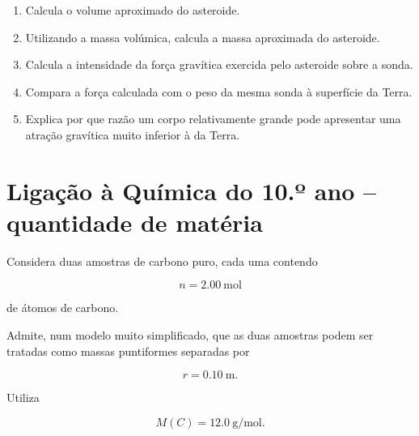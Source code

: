 \documentclass[11pt,a4paper]{article}
\newcommand{\resposta}[1][1]{
	\vspace{#1cm}
}
\begin{document}
	\begin{enumerate}[label=\textbf{\arabic*.},resume]
		
		\item Calcula o volume aproximado do asteroide.
		
		\resposta[1.0]
		
		\item Utilizando a massa volúmica, calcula a massa aproximada do asteroide.
		
		\resposta[1.2]
		
		\item Calcula a intensidade da força gravítica exercida pelo asteroide
		sobre a sonda.
		
		\resposta[1.3]
		
		\item Compara a força calculada com o peso da mesma sonda à superfície
		da Terra.
		
		\resposta[1.0]
		
		\item Explica por que razão um corpo relativamente grande pode apresentar
		uma atração gravítica muito inferior à da Terra.
		
		\resposta[1.0]
		
	\end{enumerate}
	
	\section{Ligação à Química do 10.º ano -- quantidade de matéria}
	
	Considera duas amostras de carbono puro, cada uma contendo
	
	\[
	n=\SI{2.00}{\mole}
	\]
	
	de átomos de carbono.
	
	Admite, num modelo muito simplificado, que as duas amostras podem ser
	tratadas como massas puntiformes separadas por
	
	\[
	r=\SI{0.10}{\metre}.
	\]
	
	Utiliza
	
	\[
	M(C)=\SI{12.0}{\gram\per\mole}.
	\]
	
\end{document}
